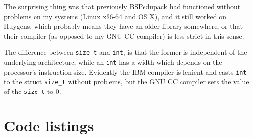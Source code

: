 \documentclass[a4paper]{article}
\begin{document}
The surprising thing was that previously BSPedupack had functioned without problems on my systems (Linux x86-64 and OS X), and it still worked on Huygens, which probably means they have an older library somewhere, or that their compiler (as opposed to my GNU CC compiler) is less strict in this sense.

The difference between \texttt{size\_t} and \texttt{int}, is that the former is independent of the underlying architecture, while an \texttt{int} has a width which depends on the processor's instruction size. Evidently the IBM compiler is lenient and casts \texttt{int} to the struct \texttt{size\_t} without problems, but the GNU CC compiler sets the value of the \texttt{size\_t} to 0.


\section{Code listings}




\end{document}

